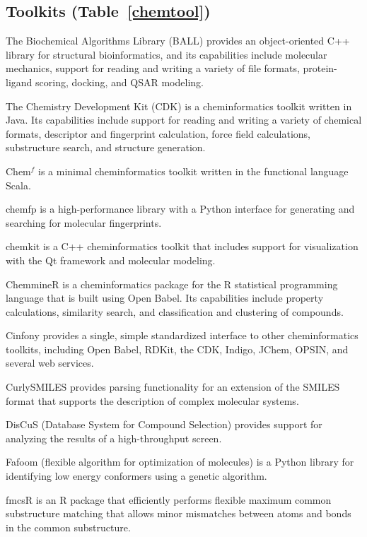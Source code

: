 \subsection*{Toolkits (Table~\ref{chemtool})} 
The Biochemical Algorithms Library (BALL) \cite{Hildebrandt_2010} provides an object-oriented C++ library for structural bioinformatics, and its capabilities include molecular mechanics, support for reading and writing a variety of file formats, protein-ligand scoring, docking, and QSAR modeling.

The Chemistry Development Kit (CDK) \cite{Steinbeck_2006} is a cheminformatics toolkit written in Java.  Its capabilities include support for reading and writing a variety of chemical formats, descriptor and fingerprint calculation, force field calculations, substructure search, and structure generation.

Chem$^f$ \cite{H_ck_2012} is a minimal cheminformatics toolkit written in the functional language Scala.

chemfp \cite{dalke2011chemfp} is a high-performance library with a Python interface for generating and searching for molecular fingerprints. 
 
chemkit is a C++ cheminformatics toolkit that includes support for visualization with the Qt framework and molecular modeling.

ChemmineR \cite{Cao_2008}  is a cheminformatics package for the R statistical programming language that is built using Open Babel. Its capabilities include property calculations, similarity search, and classification and clustering of compounds.

Cinfony \cite{cinfony} provides a single, simple standardized interface to other cheminformatics toolkits, including Open Babel, RDKit, the CDK, Indigo, JChem, OPSIN, and several web services.

CurlySMILES \cite{Drefahl_2011} provides parsing functionality for an extension of the SMILES format that supports the description of complex molecular systems.

DisCuS (Database System for Compound Selection) \cite{W_jcikowski_2014} provides support for analyzing the results of a high-throughput screen.

Fafoom (flexible algorithm for optimization of molecules) \cite{Supady_2015} is a Python library for identifying low energy conformers using a genetic algorithm.

fmcsR \cite{Goecks_2010} is an R package that efficiently performs flexible maximum common substructure matching that allows minor mismatches between atoms and bonds in the common substructure.

